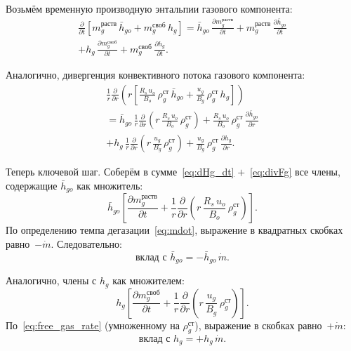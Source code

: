 \documentclass[12pt,a4paper]{article}
\begin{document}
Возьмём временную производную энтальпии газового компонента:
\begin{multline}\label{eq:dHg_dt}
  \frac{\partial}{\partial t}\!\left[
    m_g^{\text{раств}}\,\bar{h}_{go}
    + m_g^{\text{своб}}\,h_g
  \right]
  = \bar{h}_{go}\,\frac{\partial m_g^{\text{раств}}}{\partial t}
    + m_g^{\text{раств}}\,\frac{\partial\bar{h}_{go}}{\partial t}
  \\
    + h_g\,\frac{\partial m_g^{\text{своб}}}{\partial t}
    + m_g^{\text{своб}}\,\frac{\partial h_g}{\partial t}.
\end{multline}

Аналогично, дивергенция конвективного потока газового компонента:
\begin{multline}\label{eq:divFg}
  \frac{1}{r}\frac{\partial}{\partial r}\!\left(r\!\left[
    \frac{R_s\,u_o}{B_o}\,\rho_g^{\text{ст}}\,\bar{h}_{go}
    + \frac{u_g}{B_g}\,\rho_g^{\text{ст}}\,h_g
  \right]\right) \\
  = \bar{h}_{go}\,\frac{1}{r}\frac{\partial}{\partial r}\!
      \left(r\,\frac{R_s\,u_o}{B_o}\,\rho_g^{\text{ст}}\right)
    + \frac{R_s\,u_o}{B_o}\,\rho_g^{\text{ст}}\,
      \frac{\partial\bar{h}_{go}}{\partial r}
  \\
    + h_g\,\frac{1}{r}\frac{\partial}{\partial r}\!
      \left(r\,\frac{u_g}{B_g}\,\rho_g^{\text{ст}}\right)
    + \frac{u_g}{B_g}\,\rho_g^{\text{ст}}\,
      \frac{\partial h_g}{\partial r}.
\end{multline}

Теперь ключевой шаг. Соберём в сумме~\eqref{eq:dHg_dt}
$+$~\eqref{eq:divFg} все члены, содержащие $\bar{h}_{go}$
как множитель:
\begin{equation}\label{eq:hgo_group}
  \bar{h}_{go}\!\left[
    \frac{\partial m_g^{\text{раств}}}{\partial t}
    + \frac{1}{r}\frac{\partial}{\partial r}\!\left(
        r\,\frac{R_s\,u_o}{B_o}\,\rho_g^{\text{ст}}
      \right)
  \right].
\end{equation}
По определению темпа дегазации~\eqref{eq:mdot}, выражение в квадратных
скобках равно~$-\dot{m}$. Следовательно:
\begin{equation}\label{eq:hgo_result}
  \text{вклад с }\bar{h}_{go} = -\bar{h}_{go}\,\dot{m}.
\end{equation}

Аналогично, члены с $h_g$ как множителем:
\begin{equation}\label{eq:hg_group}
  h_g\!\left[
    \frac{\partial m_g^{\text{своб}}}{\partial t}
    + \frac{1}{r}\frac{\partial}{\partial r}\!\left(
        r\,\frac{u_g}{B_g}\,\rho_g^{\text{ст}}
      \right)
  \right].
\end{equation}
По~\eqref{eq:free_gas_rate} (умноженному на $\rho_g^{\text{ст}}$),
выражение в скобках равно~$+\dot{m}$:
\begin{equation}\label{eq:hg_result}
  \text{вклад с }h_g = +h_g\,\dot{m}.
\end{equation}
\end{document}
